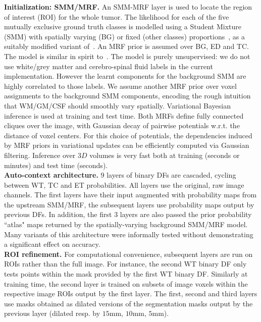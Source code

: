 \noindent
\textbf{Initialization: SMM/MRF.} An SMM-MRF layer is used to locate the region of interest (ROI) for the whole tumor. The likelihood for each of the five mutually exclusive ground truth classes is modelled using a Student Mixture (SMM) with spatially varying (BG) or fixed (other classes) proportions~\cite{archambeau2007robust}, as a suitably modified variant of~\cite{cordier2015patch}. An MRF prior is assumed over BG, ED and TC. The model is similar in spirit to~\cite{zhang2001segmentation,menze2010generative}. The model is purely unsupervised: we do not use white/grey matter and cerebro-spinal fluid labels in the current implementation. However the learnt components for the background SMM are highly correlated to those labels. We assume another MRF prior over voxel assignments to the background SMM components, encoding the rough intuition that WM/GM/CSF should smoothly vary spatially. Variational Bayesian inference is used at training and test time. Both MRFs define fully connected cliques over the image, with Gaussian decay of pairwise potentials w.r.t. the distance of voxel centers. For this choice of potentials, the dependencies induced by MRF priors in variational updates can be efficiently computed via Gaussian filtering. Inference over $3D$ volumes is very fast both at training (seconds or minutes) and test time (seconds).\\

\noindent
\textbf{Auto-context architecture.} $9$ layers of binary DFs are cascaded, cycling between WT, TC and ET probabilities. All layers use the original, raw image channels. The first layers have their input augmented with probability maps from the upstream SMM/MRF, the subsequent layers use probability maps output by previous DFs. In addition, the first $3$ layers are also passed the prior probability ``atlas" maps returned by the spatially-varying background SMM/MRF model. Many variants of this architecture were informally tested without demonstrating a significant effect on accuracy.\\

\noindent
\textbf{ROI refinement.} For computational convenience, subsequent layers are run on ROIs rather than the full image. For instance, the second WT binary DF only tests points within the mask provided by the first WT binary DF. Similarly at training time, the second layer is trained on subsets of image voxels within the respective image ROIs output by the first layer. The first, second and third layers use masks obtained as dilated versions of the segmentation masks output by the previous layer (dilated resp. by $15$mm, $10$mm, $5$mm).\\

